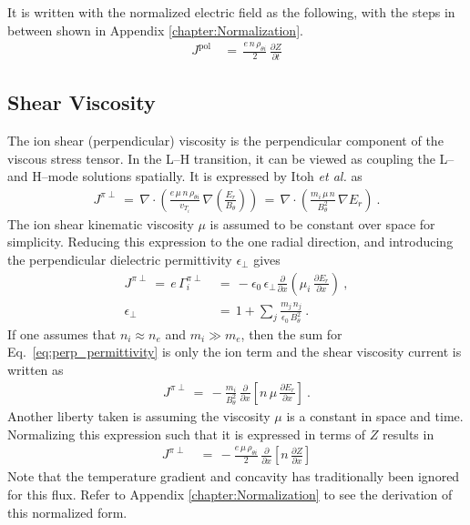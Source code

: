 It is written with the normalized electric field as the following, with the steps in between shown in Appendix \ref{chapter:Normalization}.
\begin{align} %
	J^\text{pol} \,&=\, \frac{e \, n \, \rho_{\theta i}}{2} \,
		\frac{\partial Z}{\partial t} \label{eq:polarization_current_normalized}
\end{align}


\subsection{Shear Viscosity}\label{ssec:shear_viscosity}
The ion shear (perpendicular) viscosity is the perpendicular component of the viscous stress tensor.
In the L--H transition, it can be viewed as coupling the L-- and H--mode solutions spatially.
It is expressed by Itoh \emph{et al.} \cite{itoh_elmy_1993} as
\begin{align} %
	J^{\pi\perp} \,=\, \nabla \cdot \left(\frac{e \, \mu \, n \, \rho_{\theta i}}
		{v_{T_i}} \, \nabla\left(\frac{E_r}{B_\theta}\right)\right)
		\,=\, \nabla \cdot \left(\frac{m_i \, \mu \, n}{B_\theta^2} \,
		\nabla E_r\right)~. \label{eq:shear_visc_current_definition}
\end{align}
The ion shear kinematic viscosity $\mu$ is assumed to be constant over space for simplicity.
Reducing this expression to the one radial direction, and introducing the perpendicular dielectric permittivity $\epsilon_\perp$ \cite{kiviniemi_numerical_2001} gives
\begin{align} %
	J^{\pi\perp} \,=\, e\,\Gamma_i^{\pi\perp} \,&=\,
		-\epsilon_0\,\epsilon_\perp \frac{\partial}{\partial x}
		\left(\mu_i \, \frac{\partial E_r}{\partial x}\right)~, \\
	\epsilon_\perp \,&=\, 1 + \sum_j \frac{m_j \, n_j}{\epsilon_0 \, B_\theta^2}~.
		\label{eq:perp_permittivity}
\end{align}
If one assumes that $n_i \approx n_e$ and $m_i \gg m_e$, then the sum for Eq.~\ref{eq:perp_permittivity} is only the ion term and the shear viscosity current is written as
\begin{align} %
	J^{\pi\perp} \,=\, -\frac{m_i}{B_\theta^2} \,
		\frac{\partial}{\partial x} \left[n \, \mu \,
		\frac{\partial E_r}{\partial x}\right]~. \label{eq:shear_current_E_r}
\end{align}
Another liberty taken is assuming the viscosity $\mu$ is a constant in space and time.
Normalizing this expression such that it is expressed in terms of $Z$ results in
\begin{align} %
	J^{\pi\perp} \,&=\, -\frac{e \, \mu \, \rho_{\theta i}}{2} \,
		\frac{\partial}{\partial x} \left[n \, \frac{\partial Z}
		{\partial x}\right] \label{eq:shear_current_normalized}
\end{align}
Note that the temperature gradient and concavity has traditionally been ignored for this flux.
Refer to Appendix \ref{chapter:Normalization} to see the derivation of this normalized form.



